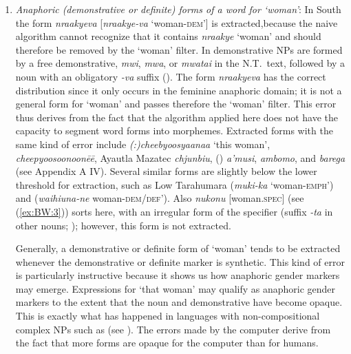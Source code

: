 \documentclass[output=collectionpaper]{langsci/langscibook}
\begin{document}
\begin{enumerate}[label=(\alph*)]
\item
\emph{Anaphoric (demonstrative or definite) forms of a word for ‘woman’}: In South  the form \textit{nraakyeva} [\textit{nraakye-va} ‘woman-\textsc{dem}’] is extracted,\linebreak because the naive algorithm cannot recognize that it contains \textit{nraakye} ‘woman’ and should therefore be removed by the ‘woman’ filter. In  demonstrative NPs are formed by a free demonstrative, \textit{mwi}, \textit{mwa}, or \textit{mwatai} in the N.T.\ text, followed by a noun with an obligatory \textit{-va} suffix (\citealt[584]{Vincent2010}). The form \textit{nraakyeva} has the correct distribution since it only occurs in the feminine anaphoric domain; it is not a general form for ‘woman’ and passes therefore the ‘woman’ filter. This error thus derives from the fact that the algorithm applied here does not have the capacity to segment word forms into morphemes. Extracted forms with the same kind of error include  \textit{(:)cheebyoosyaanaa} ‘this woman’,  \textit{cheepyoosoonoonēē}, Ayautla Mazatec \textit{chjunbiu},  () \textit{a'musi},  \textit{ambomo}, and  \textit{barega}
(see Appendix A IV). Several similar forms are slightly below the lower threshold for extraction, such as Low Tarahumara (\textit{muki-ka} ‘woman-\textsc{emph}') and  (\textit{waihi\-u\-na-ne} woman-\textsc{dem/def}’). Also  \textit{nukonu} [woman.\textsc{spec}] (see (\ref{ex:BW:3})) sorts here, with an irregular form of the specifier (suffix \textit{-ta} in other nouns; \citealt[92]{Arsjoe1999}); however, this form is not extracted.

Generally, a demonstrative or definite form of ‘woman’ tends to be extracted whenever the demonstrative or definite marker is synthetic. This kind of error is particularly instructive because it shows us how anaphoric gender markers may emerge. Expressions for ‘that woman’ may qualify as anaphoric gender markers to the extent that the noun and demonstrative have become opaque. This is exactly what has happened in languages with non-compositional complex NPs such as  (see  ). The errors made by the computer derive from the fact that more forms are opaque for the computer than for humans.


\end{enumerate}
\end{document}
